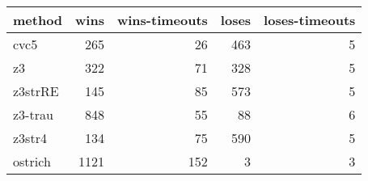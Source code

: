 \begin{tabular}{lrrrr}
\hline
 method   &   wins &   wins-timeouts &   loses &   loses-timeouts \\
\hline
 cvc5     &    265 &              26 &     463 &                5 \\
 z3       &    322 &              71 &     328 &                5 \\
 z3strRE  &    145 &              85 &     573 &                5 \\
 z3-trau  &    848 &              55 &      88 &                6 \\
 z3str4   &    134 &              75 &     590 &                5 \\
 ostrich  &   1121 &             152 &       3 &                3 \\
\hline
\end{tabular}
